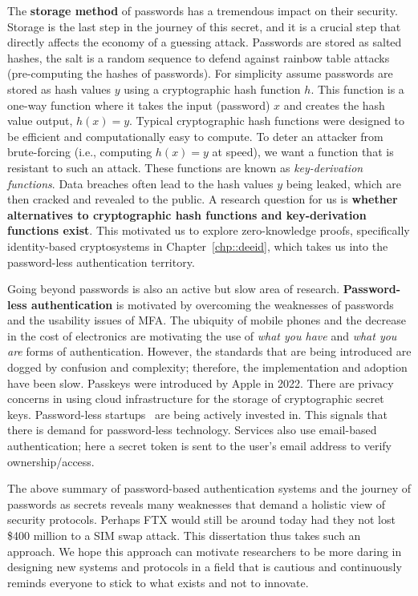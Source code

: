 The \textbf{storage method} of passwords has a tremendous impact on their security. Storage is the last step in the journey of this secret, and it is a crucial step that directly affects the economy of a guessing attack. Passwords are stored as salted hashes, the salt is a random sequence to defend against rainbow table attacks (pre-computing the hashes of passwords). For simplicity assume passwords are stored as hash values $y$ using a cryptographic hash function $h$. This function is a one-way function where it takes the input (password) $x$ and creates the hash value output, $h(x) = y$. Typical cryptographic hash functions were designed to be efficient and computationally easy to compute. To deter an attacker from brute-forcing (i.e., computing $h(x) = y$ at speed), we want a function that is resistant to such an attack. These functions are known as \textit{key-derivation functions}. Data breaches often lead to the hash values $y$ being leaked, which are then cracked and revealed to the public. A research question for us is \textbf{whether alternatives to cryptographic hash functions and key-derivation functions exist}. This motivated us to explore zero-knowledge proofs, specifically identity-based cryptosystems in Chapter~\ref{chp::deeid}, which takes us into the password-less authentication territory.

Going beyond passwords is also an active but slow area of research. \textbf{Password-less authentication} is motivated by overcoming the weaknesses of passwords and the usability issues of MFA. The ubiquity of mobile phones and the decrease in the cost of electronics are motivating the use of \textit{what you have} and \textit{what you are} forms of authentication. However, the standards that are being introduced are dogged by confusion and complexity; therefore, the implementation and adoption have been slow. Passkeys were introduced by Apple in 2022. There are privacy concerns in using cloud infrastructure for the storage of cryptographic secret keys. Password-less startups~\cite{wiggers_passwordless_2020, wiggers_passwordless_2023, kovacs_hypr_2022} are being actively invested in. This signals that there is demand for password-less technology. Services also use email-based authentication; here a secret token is sent to the user's email address to verify ownership/access.

The above summary of password-based authentication systems and the journey of passwords as secrets reveals many weaknesses that demand a holistic view of security protocols. Perhaps FTX would still be around today had they not lost \$400 million to a SIM swap attack. This dissertation thus takes such an approach. We hope this approach can motivate researchers to be more daring in designing new systems and protocols in a field that is cautious and continuously reminds everyone to stick to what exists and not to innovate.


